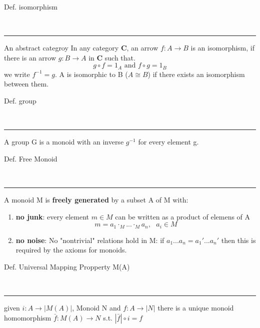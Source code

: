 \begin{note}
  \begin{field}
    Def. isomorphism
  \end{field} \\
  \noindent\rule[0.5ex]{\linewidth}{1pt}
  \begin{field}
    An abstract categroy 
    In any category \textbf{C}, an arrow $f: A\rightarrow B$ is an isomorphism, if there is an arrow $g: B\rightarrow A$ in \textbf{C} such that.
    \[ g\circ f = 1_A\text{ and }f\circ g = 1_B \]
    we write $f^{-1} = g$.
    A is isomorphic to B ($A\cong B$) if there exists an isomorphism between them.
  \end{field}
\end{note}

\begin{note}
  \begin{field}
    Def. group
  \end{field} \\
  \noindent\rule[0.5ex]{\linewidth}{1pt}
  \begin{field}
    A group G is a monoid with an inverse $g^{-1}$ for every element g.
  \end{field}
\end{note}

\begin{note}
  \begin{field}
    Def. Free Monoid
  \end{field} \\
  \noindent\rule[0.5ex]{\linewidth}{1pt}
  \begin{field}
    A monoid M is \textbf{freely generated} by a subset A of M with:
    \begin{enumerate}
      \item \textbf{no junk}: every element $m\in M$ can be written as a product of elemens of A\\
        \[ m = a_1 \cdot_M ... \cdot_M a_n,\ \ \ a_i\in M \]
      \item \textbf{no noise}: No "nontrivial" relations hold in M: if $a_1 ... a_n = a_1' ... a_n'$ then this is required by the axioms for monoids.
    \end{enumerate}
  \end{field}
\end{note}

\begin{note}
  \begin{field}
    Def. Universal Mapping Propperty M(A)
  \end{field} \\
  \noindent\rule[0.5ex]{\linewidth}{1pt}
  \begin{field}
    given $i: A \rightarrow |M(A)|$, Monoid N and $f: A \rightarrow |N|$ there is a unique monoid homomorphism $\bar f: M(A) \rightarrow N$ s.t. $|\bar f|\circ i = f$
  \end{field}
\end{note}


